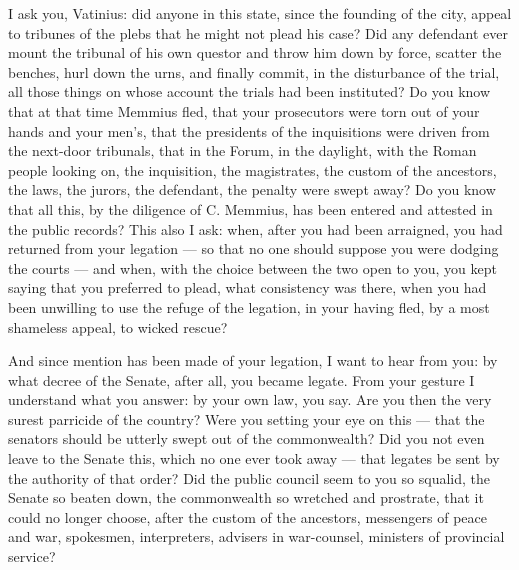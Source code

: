  I ask you, Vatinius: did anyone in this state, since the founding of the city, appeal to tribunes of the plebs that he might not plead his case? Did any defendant ever mount the tribunal of his own questor and throw him down by force, scatter the benches, hurl down the urns, and finally commit, in the disturbance of the trial, all those things on whose account the trials had been instituted? Do you know that at that time Memmius fled, that your prosecutors were torn out of your hands and your men's, that the presidents of the inquisitions were driven from the next-door tribunals, that in the Forum, in the daylight, with the Roman people looking on, the inquisition, the magistrates, the custom of the ancestors, the laws, the jurors, the defendant, the penalty were swept away? Do you know that all this, by the diligence of C. Memmius, has been entered and attested in the public records? This also I ask: when, after you had been arraigned, you had returned from your legation --- so that no one should suppose you were dodging the courts --- and when, with the choice between the two open to you, you kept saying that you preferred to plead, what consistency was there, when you had been unwilling to use the refuge of the legation, in your having fled, by a most shameless appeal, to wicked rescue?

 And since mention has been made of your legation, I want to hear from you: by what decree of the Senate, after all, you became legate. From your gesture I understand what you answer: by your own law, you say. Are you then the very surest parricide of the country? Were you setting your eye on this --- that the senators should be utterly swept out of the commonwealth? Did you not even leave to the Senate this, which no one ever took away --- that legates be sent by the authority of that order? Did the public council seem to you so squalid, the Senate so beaten down, the commonwealth so wretched and prostrate, that it could no longer choose, after the custom of the ancestors, messengers of peace and war, spokesmen, interpreters, advisers in war-counsel, ministers of provincial service?

